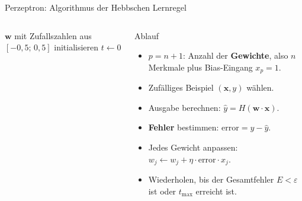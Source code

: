 \begin{frame}{Perzeptron: Algorithmus der Hebbschen Lernregel}
\scriptsize
\begin{columns}
\begin{algorithm}[H]
\SetAlgoLined
{}
$\mathbf{w}$ mit Zufallszahlen aus $[-0{,}5;\,0{,}5]$ initialisieren\;
$t \leftarrow 0$\;
\caption{Hebbsche Lernregel}
\end{algorithm}

\begin{blockC1}{\footnotesize Ablauf}
  \footnotesize
\begin{itemize}
  \item $p = n + 1$: Anzahl der \textbf{Gewichte}, also $n$ Merkmale plus
        Bias-Eingang $x_p = 1$.
  \item Zufälliges Beispiel $(\mathbf{x}, y)$ wählen.
  \item Ausgabe berechnen:
        $\hat{y} = H(\mathbf{w}\cdot\mathbf{x})$.
  \item \textbf{Fehler} bestimmen:
        $\text{error} = y - \hat{y}$.
  \item Jedes Gewicht anpassen:
        $w_j \leftarrow w_j + \eta\cdot\text{error}\cdot x_j$.
  \item Wiederholen, bis der Gesamtfehler $E < \varepsilon$ ist oder
        $t_{\max}$ erreicht ist.
\end{itemize}
\end{blockC1}
\end{columns}
  \end{frame}

